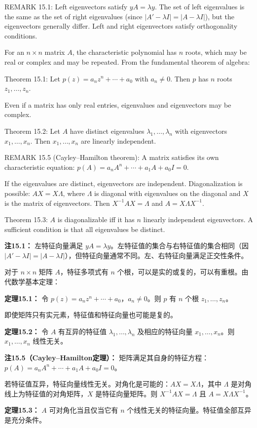 \begin{original}
REMARK 15.1: Left eigenvectors satisfy $yA = \lambda y$. The set of left eigenvalues is the same as the set of right eigenvalues (since $|A' - \lambda I| = |A - \lambda I|$), but the eigenvectors generally differ. Left and right eigenvectors satisfy orthogonality conditions.

For an $n \times n$ matrix $A$, the characteristic polynomial has $n$ roots, which may be real or complex and may be repeated. From the fundamental theorem of algebra:

Theorem 15.1: Let $p(z) = a_n z^n + \cdots + a_0$ with $a_n \neq 0$. Then $p$ has $n$ roots $z_1, \dots, z_n$.

Even if a matrix has only real entries, eigenvalues and eigenvectors may be complex.

Theorem 15.2: Let $A$ have distinct eigenvalues $\lambda_1, \dots, \lambda_n$ with eigenvectors $x_1, \dots, x_n$. Then $x_1, \dots, x_n$ are linearly independent.

REMARK 15.5 (Cayley--Hamilton theorem): A matrix satisfies its own characteristic equation: $p(A) = a_n A^n + \cdots + a_1 A + a_0 I = 0$.

If the eigenvalues are distinct, eigenvectors are independent. Diagonalization is possible: $AX = X\Lambda$, where $\Lambda$ is diagonal with eigenvalues on the diagonal and $X$ is the matrix of eigenvectors. Then $X^{-1}AX = \Lambda$ and $A = X\Lambda X^{-1}$.

Theorem 15.3: $A$ is diagonalizable iff it has $n$ linearly independent eigenvectors. A sufficient condition is that all eigenvalues be distinct.
\end{original}
\begin{translation}
\textbf{注15.1：} 左特征向量满足 $yA = \lambda y$。左特征值的集合与右特征值的集合相同（因 $|A' - \lambda I| = |A - \lambda I|$），但特征向量通常不同。左、右特征向量满足正交性条件。

对于 $n \times n$ 矩阵 $A$，特征多项式有 $n$ 个根，可以是实的或复的，可以有重根。由代数学基本定理：

\textbf{定理15.1：} 令 $p(z) = a_n z^n + \cdots + a_0$，$a_n \neq 0$。则 $p$ 有 $n$ 个根 $z_1, \dots, z_n$。

即使矩阵只有实元素，特征值和特征向量也可能是复的。

\textbf{定理15.2：} 令 $A$ 有互异的特征值 $\lambda_1, \dots, \lambda_n$ 及相应的特征向量 $x_1, \dots, x_n$。则 $x_1, \dots, x_n$ 线性无关。

\textbf{注15.5（Cayley--Hamilton定理）：} 矩阵满足其自身的特征方程：$p(A) = a_n A^n + \cdots + a_1 A + a_0 I = 0$。

若特征值互异，特征向量线性无关。对角化是可能的：$AX = X\Lambda$，其中 $\Lambda$ 是对角线上为特征值的对角矩阵，$X$ 是特征向量矩阵。则 $X^{-1}AX = \Lambda$ 且 $A = X\Lambda X^{-1}$。

\textbf{定理15.3：} $A$ 可对角化当且仅当它有 $n$ 个线性无关的特征向量。特征值全部互异是充分条件。
\end{translation}

